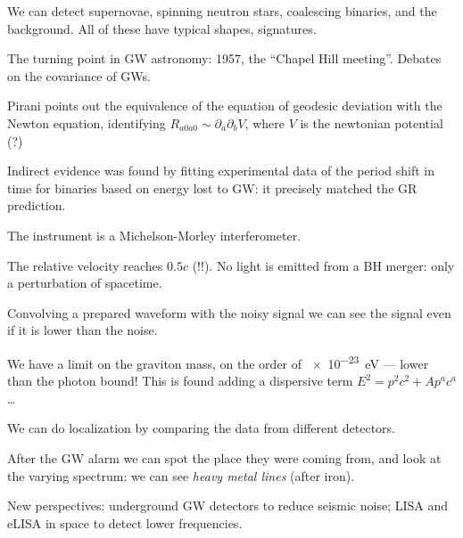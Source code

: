 \documentclass[main.tex]{subfiles}
\begin{document}
We can detect supernovae, spinning neutron stars, coalescing binaries, and the background. All of these have typical shapes, signatures.

The turning point in GW astronomy: 1957, the ``Chapel Hill meeting''.
Debates on the covariance of GWs.

Pirani points out the equivalence of the equation of geodesic deviation with the Newton equation, identifying \(R_{a 0 a 0 } \sim \partial_{a } \partial_b V\), where \(V\) is the newtonian potential (?)

Indirect evidence was found by fitting experimental data of the period shift in time for binaries based on energy lost to GW: it precisely matched the GR prediction.

The instrument is a Michelson-Morley interferometer.

The relative velocity reaches \(0.5c\) (!!).
No light is emitted from a BH merger: only a perturbation of spacetime.

Convolving a prepared waveform with the noisy signal we can see the signal even if it is lower than the noise.

We have a limit on the graviton mass, on the order of \SI{e-23}{eV} --- lower than the photon bound!
This is found adding a dispersive term \(E^2 = p^2c^2+ A p^{a} c^{a}\)\dots


We can do localization by comparing the data from different detectors.

After the GW alarm we can spot the place they were coming from, and look at the varying spectrum: we can see \emph{heavy metal lines} (after iron).

New perspectives: underground GW detectors to reduce seismic noise; LISA and eLISA in space to detect lower frequencies.
\end{document}
